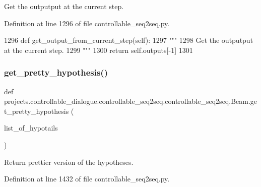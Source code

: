 \begin{DoxyVerb}Get the outputput at the current step.
\end{DoxyVerb}
 

Definition at line 1296 of file controllable\+\_\+seq2seq.\+py.


\begin{DoxyCode}
1296     \textcolor{keyword}{def }get\_output\_from\_current\_step(self):
1297         \textcolor{stringliteral}{"""}
1298 \textcolor{stringliteral}{        Get the outputput at the current step.}
1299 \textcolor{stringliteral}{        """}
1300         \textcolor{keywordflow}{return} self.outputs[-1]
1301 
\end{DoxyCode}
\mbox{\label{classprojects_1_1controllable__dialogue_1_1controllable__seq2seq_1_1controllable__seq2seq_1_1Beam_a8790caa6448f76b870a89dab9a07e419}} 
\subsubsection{\texorpdfstring{get\+\_\+pretty\+\_\+hypothesis()}{get\_pretty\_hypothesis()}}
{\footnotesize\ttfamily def projects.\+controllable\+\_\+dialogue.\+controllable\+\_\+seq2seq.\+controllable\+\_\+seq2seq.\+Beam.\+get\+\_\+pretty\+\_\+hypothesis (\begin{DoxyParamCaption}\item[{}]{list\+\_\+of\+\_\+hypotails }\end{DoxyParamCaption})\hspace{0.3cm}{\ttfamily [static]}}

\begin{DoxyVerb}Return prettier version of the hypotheses.
\end{DoxyVerb}
 

Definition at line 1432 of file controllable\+\_\+seq2seq.\+py.


